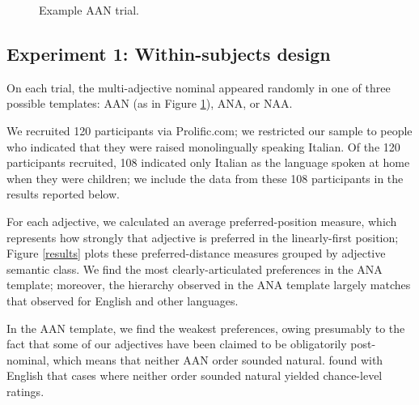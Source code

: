 \documentclass[11pt]{article}
\begin{document}
\begin{figure}[tb]
	\centering
	\caption{Example AAN trial.}
	\label{example-trial}
	\end{figure}

\subsection{Experiment 1: Within-subjects design}

On each trial, the multi-adjective nominal appeared randomly in one of three possible templates: AAN (as in Figure \ref{example-trial}), ANA, or NAA.

We recruited 120 participants via Prolific.com; we restricted our sample to people who indicated that they were raised monolingually speaking Italian. Of the 120 participants recruited, 108 indicated only Italian as the language spoken at home when they were children; we include the data from these 108 participants in the results reported below.

For each adjective, we calculated an average preferred-position measure, which represents how strongly that adjective is preferred in the linearly-first position; Figure \ref{results} plots these preferred-distance measures grouped by adjective semantic class. We find the most clearly-articulated preferences in the ANA template; moreover, the hierarchy observed in the ANA template largely matches that observed for English and other languages. 

In the AAN template, we find the weakest preferences, owing presumably to the fact that some of our adjectives have been claimed to be obligatorily post-nominal, which means that neither AAN order sounded natural. \cite{scontrasetal2017adjectives} found with English that cases where neither order sounded natural yielded chance-level ratings. 
\end{document}
